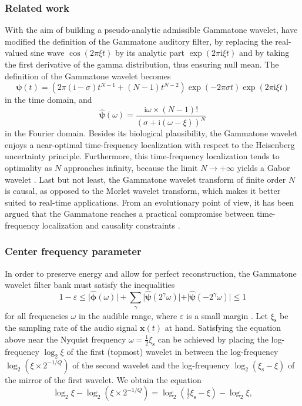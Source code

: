\documentclass[smallextended]{svjour3}
\begin{document}
\subsubsection*{Related work}

With the aim of building a pseudo-analytic admissible Gammatone wavelet,
\cite{Venkitaraman2014} have modified the definition of the Gammatone
auditory filter, by replacing the real-valued sine wave $\cos(2\pi \xi t)$
by its analytic part $\exp(2\pi\mathrm{\mathrm{i}}\xi t)$ and by taking
the first derivative of the gamma distribution, thus ensuring null
mean. The definition of the Gammatone wavelet becomes
\[
\boldsymbol{\psi}(t)=\left(2\pi(\mathrm{i}-\sigma)t^{N-1}+(N-1)t^{N-2}\right)\exp(-2\pi\sigma t)\exp(2\pi\mathrm{i}\xi t)
\]
in the time domain, and
\[
\boldsymbol{\widehat{\psi}}(\omega)=\dfrac{\mathrm{i}\omega\times(N-1)!}{(\sigma+\mathrm{i}(\omega-\xi))^{N}}
\]
in the Fourier domain. Besides its biological plausibility, the Gammatone
wavelet enjoys a near-optimal time-frequency localization with respect
to the Heisenberg uncertainty principle. Furthermore, this time-frequency
localization tends to optimality as $N$ approaches infinity, because
the limit $N\rightarrow+\infty$ yields a Gabor wavelet \cite{Cohen1995}.
Last but not least, the Gammatone wavelet transform of finite order
$N$ is causal, as opposed to the Morlet wavelet transform, which
makes it better suited to real-time applications. From an evolutionary
point of view, it has been argued that the Gammatone reaches a practical
compromise between time-frequency localization and causality constraints \cite{Venkitaraman2014}.


\subsubsection*{Center frequency parameter}

In order to preserve energy and allow for perfect reconstruction,
the Gammatone wavelet filter bank must satisfy the inequalities
\[
1-\varepsilon\leq\vert\boldsymbol{\hat{\phi}}(\omega)\vert+\sum_{\gamma}\vert\boldsymbol{\hat{\psi}}(2^{\gamma}\omega)\vert+\vert\boldsymbol{\hat{\psi}}(-2^{\gamma}\omega)\vert\leq1
\]
for all frequencies $\omega$ in the audible range, where $\varepsilon$ is a small margin
\cite{Anden2014}. 
Let $\xi_{\mathrm{s}}$ be the sampling rate of the audio signal $\boldsymbol{x}(t)$ at hand.
Satisfying the equation above near the Nyquist
frequency $\omega=\frac{1}{2}\xi_{\mathrm{s}}$ can be achieved by placing the log-frequency
$\log_{2}\xi$ of the first (topmost) wavelet in between the log-frequency
$\log_{2}(\xi\times2^{-1/Q})$ of the second wavelet and the log-frequency
$\log_{2}(\xi_{\mathrm{s}}-\xi)$ of the mirror of the first wavelet. We obtain
the equation
\[
\log_{2}\xi-\log_{2}(\xi\times2^{-1/Q})=\log_{2}(\tfrac{1}{2}\xi_{\mathrm{s}}-\xi)-\log_{2}\xi,
\]
\end{document}
